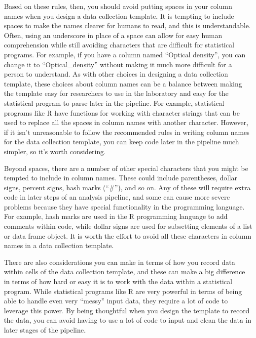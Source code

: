 \documentclass[]{tufte-book}
\begin{document}
Based on these rules, then, you should avoid putting spaces in your column names
when you design a data collection template. It is tempting to include spaces to
make the names clearer for humans to read, and this is understandable. Often,
using an underscore in place of a space can allow for easy human comprehension
while still avoiding characters that are difficult for statistical programs.
For example, if you have a column named ``Optical density'', you can change it
to ``Optical\_density'' without making it much more difficult for a person to
understand. As with other choices in designing a data collection template,
these choices about column names can be a balance between making the template
easy for researchers to use in the laboratory and easy for the statistical
program to parse later in the pipeline. For example, statistical programs like
R have functions for working with character strings that can be used to
replace all the spaces in column names with another character. However, if
it isn't unreasonable to follow the recommended rules in writing column names
for the data collection template, you can keep code later in the pipeline
much simpler, so it's worth considering.

Beyond spaces, there are a number of other special characters that you might
be tempted to include in column names. These could include parentheses, dollar signs,
percent signs, hash marks (``\#''), and so on. Any of these will require extra code
in later steps of an analysis pipeline, and some can cause more severe problems
because they have special functionality in the programming language. For example,
hash marks are used in the R programming language to add comments within code, while
dollar signs are used for subsetting elements of a list or data frame object.
It is worth the effort to avoid all these characters in column names in a data
collection template.

There are also considerations you can make in terms of how you record data within
cells of the data collection template, and these can make a big difference in terms
of how hard or easy it is to work with the data within a statistical program. While
statistical programs like R are very powerful in terms of being able to handle even
very ``messy'' input data, they require a lot of code to leverage this power. By being
thoughtful when you design the template to record the data, you can avoid having to
use a lot of code to input and clean the data in later stages of the pipeline.
\end{document}
